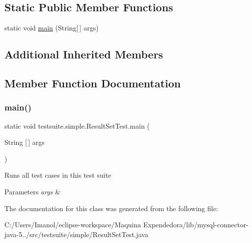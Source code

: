 \subsection*{Static Public Member Functions}
\begin{DoxyCompactItemize}
\item 
static void \mbox{\hyperlink{classtestsuite_1_1simple_1_1_result_set_test_aced933e77682f32e37de1f8cbf06decd}{main}} (String\mbox{[}$\,$\mbox{]} args)
\end{DoxyCompactItemize}
\subsection*{Additional Inherited Members}


\subsection{Member Function Documentation}
\mbox{\label{classtestsuite_1_1simple_1_1_result_set_test_aced933e77682f32e37de1f8cbf06decd}} 
\subsubsection{\texorpdfstring{main()}{main()}}
{\footnotesize\ttfamily static void testsuite.\+simple.\+Result\+Set\+Test.\+main (\begin{DoxyParamCaption}\item[{String \mbox{[}$\,$\mbox{]}}]{args }\end{DoxyParamCaption})\hspace{0.3cm}{\ttfamily [static]}}

Runs all test cases in this test suite


\begin{DoxyParams}{Parameters}
{\em args} & \\
\hline
\end{DoxyParams}


The documentation for this class was generated from the following file\+:\begin{DoxyCompactItemize}
\item 
C\+:/\+Users/\+Imanol/eclipse-\/workspace/\+Maquina Expendedora/lib/mysql-\/connector-\/java-\/5../src/testsuite/simple/Result\+Set\+Test.\+java\end{DoxyCompactItemize}
